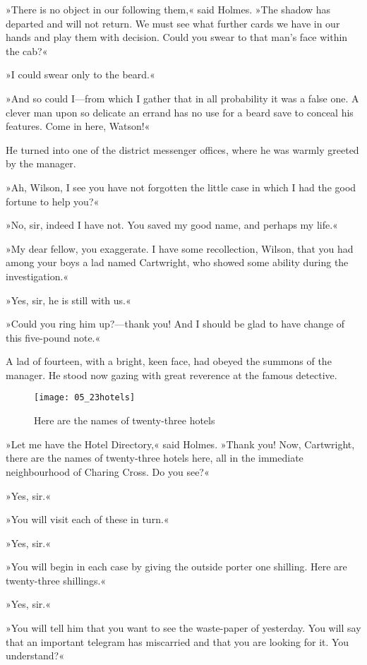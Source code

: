 »There is no object in our following them,« said Holmes. »The shadow has departed and will not return. We must see what further cards we have in our hands and play them with decision. Could you swear to that man's face within the cab?«

»I could swear only to the beard.«

»And so could I\allowbreak---\allowbreak from which I gather that in all probability it was a false one. A clever man upon so delicate an errand has no use for a beard save to conceal his features. Come in here, Watson!«

He turned into one of the district messenger offices, where he was warmly greeted by the manager.

»Ah, Wilson, I see you have not forgotten the little case in which I had the good fortune to help you?«

»No, sir, indeed I have not. You saved my good name, and perhaps my life.«

»My dear fellow, you exaggerate. I have some recollection, Wilson, that you had among your boys a lad named Cartwright, who showed some ability during the investigation.«

»Yes, sir, he is still with us.«

»Could you ring him up?\allowbreak---\allowbreak thank you! And I should be glad to have change of this five-pound note.«

A lad of fourteen, with a bright, keen face, had obeyed the summons of the manager. He stood now gazing with great reverence at the famous detective.

\begin{figure}[tbph]
\centering
\texttt{[image: 05\_23hotels]}
\caption{Here are the names of twenty-three hotels}
\end{figure}

»Let me have the Hotel Directory,« said Holmes. »Thank you! Now, Cartwright, there are the names of twenty-three hotels here, all in the immediate neighbourhood of Charing Cross. Do you see?«

»Yes, sir.«

»You will visit each of these in turn.«

»Yes, sir.«

»You will begin in each case by giving the outside porter one shilling. Here are twenty-three shillings.«

»Yes, sir.«

»You will tell him that you want to see the waste-paper of yesterday. You will say that an important telegram has miscarried and that you are looking for it. You understand?«

